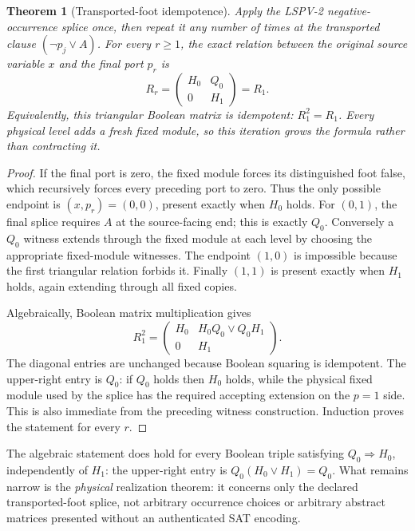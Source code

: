 \documentclass[11pt]{article}
\newtheorem{theorem}{Theorem}
\begin{document}
\begin{theorem}[Transported-foot idempotence]\label{thm:idempotence}
Apply the LSPV-2 negative-occurrence splice once, then repeat it any number of
times at the transported clause $(\neg p_j\vee A)$. For every $r\ge1$, the
exact relation between the original source variable $x$ and the final port
$p_r$ is
\[
 R_r=\begin{pmatrix}H_0&Q_0\\0&H_1\end{pmatrix}=R_1.
\]
Equivalently, this triangular Boolean matrix is idempotent: $R_1^2=R_1$.
Every physical level adds a fresh fixed module, so this iteration grows the
formula rather than contracting it.
\end{theorem}
\begin{proof}
If the final port is zero, the fixed module forces its distinguished foot
false, which recursively forces every preceding port to zero. Thus the only
possible endpoint is $(x,p_r)=(0,0)$, present exactly when $H_0$ holds.
For $(0,1)$, the final splice requires $A$ at the source-facing end; this is
exactly $Q_0$. Conversely a $Q_0$ witness extends through the fixed module at
each level by choosing the appropriate fixed-module witnesses. The endpoint
$(1,0)$ is impossible because the first triangular relation forbids it.
Finally $(1,1)$ is present exactly when $H_1$ holds, again extending through
all fixed copies.

Algebraically, Boolean matrix multiplication gives
\[
 R_1^2=
 \begin{pmatrix}H_0&H_0Q_0\lor Q_0H_1\\0&H_1\end{pmatrix}.
\]
The diagonal entries are unchanged because Boolean squaring is idempotent.
The upper-right entry is $Q_0$: if $Q_0$ holds then $H_0$ holds, while the
physical fixed module used by the splice has the required accepting extension
on the $p=1$ side. This is also immediate from the preceding witness
construction. Induction proves the statement for every $r$.
\end{proof}

The algebraic statement does hold for every Boolean triple satisfying
$Q_0\Rightarrow H_0$, independently of $H_1$: the upper-right entry is
$Q_0(H_0\lor H_1)=Q_0$. What remains narrow is the \emph{physical}
realization theorem: it concerns only the declared transported-foot splice,
not arbitrary occurrence choices or arbitrary abstract matrices presented
without an authenticated SAT encoding.
\end{document}
